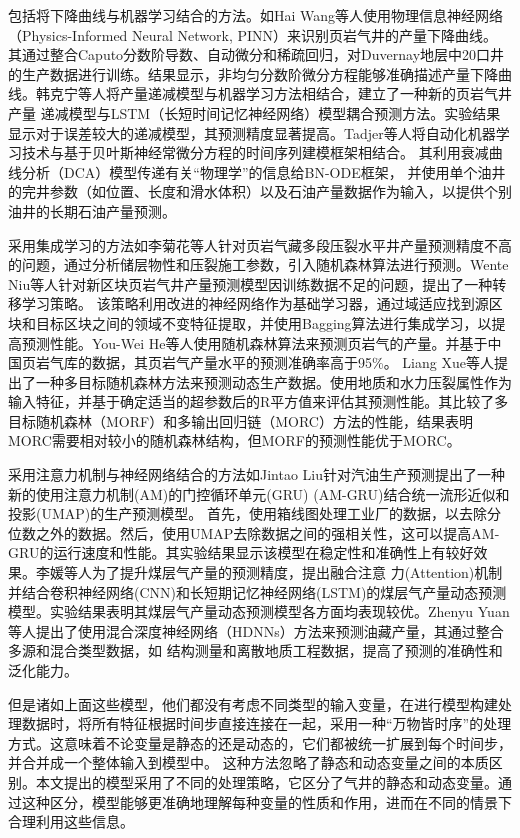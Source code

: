 包括将下降曲线与机器学习结合的方法。如Hai Wang\cite{WANG2024123387}等人使用物理信息神经网络（Physics-Informed Neural Network, PINN）来识别页岩气井的产量下降曲线。
其通过整合Caputo分数阶导数、自动微分和稀疏回归，对Duvernay地层中20口井的生产数据进行训练。结果显示，非均匀分数阶微分方程能够准确描述产量下降曲线。韩克宁等人\cite{KTDQ202305012}将产量递减模型与机器学习方法相结合，建立了一种新的页岩气井产量
递减模型与LSTM（长短时间记忆神经网络）模型耦合预测方法。实验结果显示对于误差较大的递减模型，其预测精度显著提高。Tadjer等人\cite{10.2118/209616-PA}将自动化机器学习技术与基于贝叶斯神经常微分方程的时间序列建模框架相结合。
其利用衰减曲线分析（DCA）模型传递有关“物理学”的信息给BN-ODE框架，
并使用单个油井的完井参数（如位置、长度和滑水体积）以及石油产量数据作为输入，以提供个别油井的长期石油产量预测。

采用集成学习的方法如李菊花等人\cite{CJDL202004006}针对页岩气藏多段压裂水平井产量预测精度不高的问题，通过分析储层物性和压裂施工参数，引入随机森林算法进行预测。Wente Niu等人\cite{NIU2023127443}针对新区块页岩气井产量预测模型因训练数据不足的问题，提出了一种转移学习策略。
该策略利用改进的神经网络作为基础学习器，通过域适应找到源区块和目标区块之间的领域不变特征提取，并使用Bagging算法进行集成学习，以提高预测性能。You-Wei He等人\cite{HE20231659}使用随机森林算法来预测页岩气的产量。并基于中国页岩气库的数据，其页岩气产量水平的预测准确率高于95\%。
Liang Xue等人\cite{XUE2021107801}提出了一种多目标随机森林方法来预测动态生产数据。使用地质和水力压裂属性作为输入特征，并基于确定适当的超参数后的R平方值来评估其预测性能。其比较了多目标随机森林（MORF）和多输出回归链（MORC）方法的性能，结果表明MORC需要相对较小的随机森林结构，但MORF的预测性能优于MORC。

采用注意力机制与神经网络结合的方法如Jintao Liu\cite{LIU2023125536}针对汽油生产预测提出了一种新的使用注意力机制(AM)的门控循环单元(GRU) (AM-GRU)结合统一流形近似和投影(UMAP)的生产预测模型。
首先，使用箱线图处理工业厂的数据，以去除分位数之外的数据。然后，使用UMAP去除数据之间的强相关性，这可以提高AM-GRU的运行速度和性能。其实验结果显示该模型在稳定性和准确性上有较好效果。李媛等人\cite{KXJS202302015}为了提升煤层气产量的预测精度，提出融合注意
力(Attention)机制并结合卷积神经网络(CNN)和长短期记忆神经网络(LSTM)的煤层气产量动态预测模型。实验结果表明其煤层气产量动态预测模型各方面均表现较优。Zhenyu Yuan\cite{YUAN2021108111}等人提出了使用混合深度神经网络（HDNNs）方法来预测油藏产量，其通过整合多源和混合类型数据，如
结构测量和离散地质工程数据，提高了预测的准确性和泛化能力。

但是诸如上面这些模型，他们都没有考虑不同类型的输入变量，在进行模型构建处理数据时，将所有特征根据时间步直接连接在一起，采用一种“万物皆时序”的处理方式。这意味着不论变量是静态的还是动态的，它们都被统一扩展到每个时间步，并合并成一个整体输入到模型中。
这种方法忽略了静态和动态变量之间的本质区别。本文提出的模型采用了不同的处理策略，它区分了气井的静态和动态变量。通过这种区分，模型能够更准确地理解每种变量的性质和作用，进而在不同的情景下合理利用这些信息。
